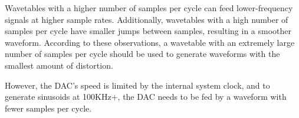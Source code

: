 \documentclass[11pt,twoside]{mitthesis}
\begin{document}
Wavetables with a higher number of samples per cycle can feed lower-frequency signals at higher sample rates.
Additionally, wavetables with a high number of samples per cycle have smaller jumps between samples, resulting in a smoother waveform.
According to these observations, a wavetable with an extremely large number of samples per cycle should be used to generate waveforms with the smallest amount of distortion.

However, the DAC's speed is limited by the internal system clock, and to generate sinusoids at 100KHz+, the DAC needs to be fed by a waveform with fewer samples per cycle.


\ifdefined\DEBUG
\end{document}
